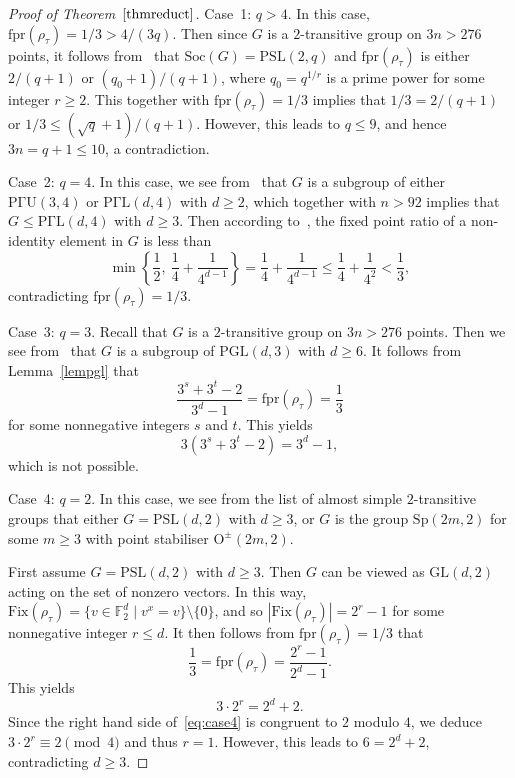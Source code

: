 \documentclass[11pt,a4paper,reqno]{amsart}
\newcommand{\Fix}{\mathrm{Fix}}
\newcommand{\fpr}{\mathrm{fpr}}
\newcommand{\GL}{\mathrm{GL}}
\newcommand{\PGaL}{\mathrm{P\Gamma L}}
\newcommand{\PGaU}{\mathrm{P\Gamma U}}
\newcommand{\PGL}{\mathrm{PGL}}
\newcommand{\PSL}{\mathrm{PSL}}
\newcommand{\Soc}{\mathrm{Soc}}
\newcommand{\Sp}{\mathrm{Sp}}
\theoremstyle{definition}
\begin{document}
\begin{proof}[Proof of Theorem~$\ref{thmreduct}$]
\textsf{Case~1}: $q>4$. In this case, $\fpr(\rho_\tau)=1/3>4/(3q)$. Then since $G$ is a $2$-transitive group on $3n>276$ points, it follows from~\cite[Theorem~1]{LS1991} that $\Soc(G)=\PSL(2,q)$ and $\fpr(\rho_\tau)$ is either $2/(q+1)$ or $(q_0+1)/(q+1)$, where $q_0=q^{1/r}$ is a prime power for some integer $r\geq2$. This together with $\fpr(\rho_\tau)=1/3$ implies that $1/3=2/(q+1)$ or $1/3\leq(\sqrt{q}+1)/(q+1)$. However, this leads to $q\leq9$, and hence $3n=q+1\leq10$, a contradiction.

\textsf{Case~2}: $q=4$. In this case, we see from~\cite[Table~7.4]{Cameron1999} that $G$ is a subgroup of either $\PGaU(3,4)$ or $\PGaL(d,4)$ with $d\geq2$, which together with $n>92$ implies that $G\leq\PGaL(d,4)$ with $d\geq3$. Then according to~\cite[Proposition~3.1]{GK2000}, the fixed point ratio of a non-identity element in $G$ is less than
\[
\min\left\{\frac{1}{2},\ \frac{1}{4}+\frac{1}{4^{d-1}}\right\}=\frac{1}{4}+\frac{1}{4^{d-1}}\leq\frac{1}{4}+\frac{1}{4^2}<\frac{1}{3},
\]
contradicting $\fpr(\rho_\tau)=1/3$.

\textsf{Case~3}: $q=3$. Recall that $G$ is a $2$-transitive group on $3n>276$ points. Then we see from~\cite[Table~7.4]{Cameron1999} that
$G$ is a subgroup of $\PGL(d,3)$ with $d\geq6$. It follows from Lemma~\ref{lempgl} that
\[
\frac{3^s+3^t-2}{3^d-1}=\fpr(\rho_\tau)=\frac{1}{3}
\]
for some nonnegative integers $s$ and $t$. This yields
\[
3(3^s+3^t-2)=3^d-1,
\]
which is not possible.

\textsf{Case~4}: $q=2$. In this case, we see from the list of almost simple $2$-transitive groups that either $G=\PSL(d,2)$ with $d\geq3$, or $G$ is the group $\Sp(2m,2)$ for some $m\geq3$ with point stabiliser $\mathrm{O}^\pm(2m,2)$.

First assume $G=\PSL(d,2)$ with $d\geq3$. Then $G$ can be viewed as $\GL(d,2)$ acting on the set of nonzero vectors. In this way, $\Fix(\rho_\tau)=\{v\in\mathbb{F}_2^d\mid v^x=v\}\setminus\{0\}$, and so $|\Fix(\rho_\tau)|=2^r-1$ for some nonnegative integer $r\leq d$.
It then follows from $\fpr(\rho_\tau)=1/3$ that
\[
\frac{1}{3}=\fpr(\rho_\tau)=\frac{2^r-1}{2^d-1}.
\]
This yields
\begin{equation}\label{eq:case4}
3\cdot2^r=2^d+2.
\end{equation}
Since the right hand side of~\eqref{eq:case4} is congruent to $2$ modulo $4$, we deduce $3\cdot2^r\equiv2\pmod{4}$ and thus $r=1$. However, this leads to $6=2^d+2$, contradicting $d\geq3$.


\end{proof}
\end{document}
